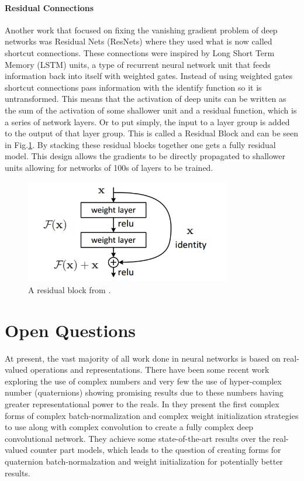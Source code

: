 \paragraph{Residual Connections}
Another work that focused on fixing the vanishing gradient problem of deep networks was Residual Nets (ResNets) \cite{he2015deep} where they used what is now called shortcut connections. 
These connections were inspired by Long Short Term Memory (LSTM) units, a type of recurrent neural network unit that feeds information back into itself with weighted gates. 
Instead of using weighted gates shortcut connections pass information with the identify function so it is untransformed. 
This means that the activation of deep units can be written as the sum of the activation of some shallower unit and a residual function, which is a series of network layers. 
Or to put simply, the input to a layer group is added to the output of that layer group. 
This is called a Residual Block and can be seen in Fig.\ref{f:resblock}. 
By stacking these residual blocks together one gets a fully residual model. 
This design allows the gradients to be directly propagated to shallower units allowing for networks of 100s of layers to be trained. 
\begin{figure}[h!]
	\centering
		\includegraphics[width=0.80\textwidth]{figures/resblock.png}
	\caption{A residual block from \cite{he2015deep}.}
	\label{f:resblock}
\end{figure}


\section{Open Questions}
At present, the vast majority of all work done in neural networks is based on real-valued operations and representations.
There have been some recent work exploring the use of complex numbers and very few the use of hyper-complex number (quaternions) showing promising results due to these numbers having greater representational power to the reals.
In \cite{trabelsi2017deep} they present the first complex forms of complex batch-normalization and complex weight initialization strategies to use along with complex convolution to create a fully complex deep convolutional network.
They achieve some state-of-the-art results over the real-valued counter part models, which leads to the question of creating forms for quaternion batch-normalzation and weight initialization for potentially better results.
